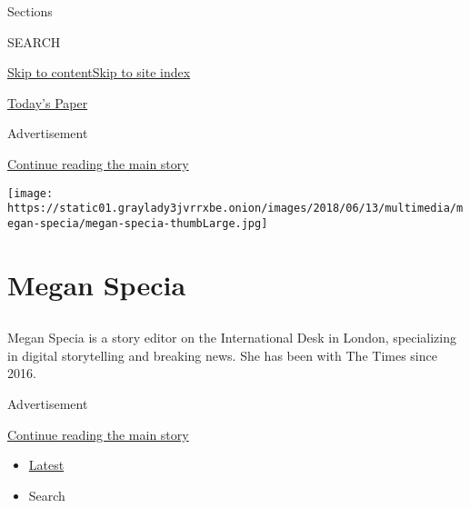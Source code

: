 Sections

SEARCH

\protect\hyperlink{site-content}{Skip to
content}\protect\hyperlink{site-index}{Skip to site index}

\href{https://myaccount.nytimes3xbfgragh.onion/auth/login?response_type=cookie\&client_id=vi}{}

\href{https://www.nytimes3xbfgragh.onion/section/todayspaper}{Today's
Paper}

Advertisement

\protect\hyperlink{after-top}{Continue reading the main story}

\texttt{[image: https://static01.graylady3jvrrxbe.onion/images/2018/06/13/multimedia/megan-specia/megan-specia-thumbLarge.jpg]}

\hypertarget{megan-specia}{%
\section{Megan Specia}\label{megan-specia}}

\subsection{}

Megan Specia is a story editor on the International Desk in London,
specializing in digital storytelling and breaking news. She has been
with The Times since 2016.

Advertisement

\protect\hyperlink{after-mid1}{Continue reading the main story}

\begin{itemize}
\tightlist
\item
  \protect\hyperlink{stream-panel}{Latest}
\item
  Search
\end{itemize}

